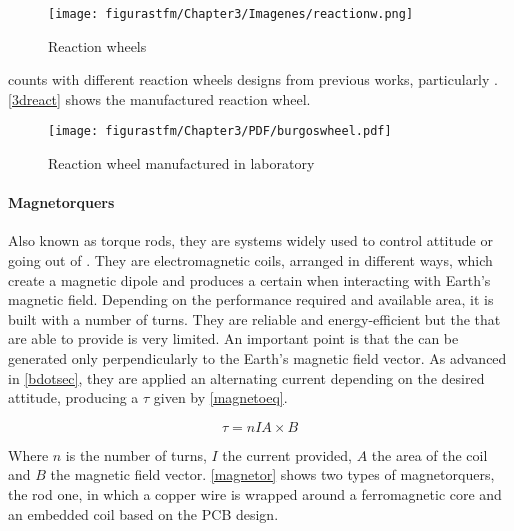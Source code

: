 			\begin{figure}[H] 
				\centering
				\texttt{[image: figurastfm/Chapter3/Imagenes/reactionw.png]}
				\caption{Reaction wheels \cite{csatshop}}      		
				\label{reactw}
  		\end{figure}
			
			 counts with different reaction wheels designs from previous works, particularly \cite{testbedgranasat}. \autoref{3dreact} shows the manufactured reaction wheel.
			
				\begin{figure}[H] 
				\centering
				\texttt{[image: figurastfm/Chapter3/PDF/burgoswheel.pdf]}
				\caption{Reaction wheel manufactured in  laboratory \cite{testbedgranasat}}      		
				\label{3dreact}
  		\end{figure}
			
\newpage
\paragraph{Magnetorquers}

Also known as torque rods, they are systems widely used to control attitude or going out of . They are electromagnetic coils, arranged in different ways, which create a magnetic dipole and produces a certain  when interacting with Earth's magnetic field. Depending on the performance required and available area, it is built with a number of turns. They are reliable and energy-efficient but the  that  are able to provide is very limited. An important point is that the  can be generated only perpendicularly to the Earth's magnetic field vector. As advanced in \ref{bdotsec}, they are applied an alternating current depending on the desired attitude, producing a  $\tau$ given by \autoref{magnetoeq}.
		
		\begin{equation}\label{magnetoeq}
		\tau=nIA\times B
		\end{equation}
		
		Where $n$ is the number of turns, $I$ the current provided, $A$ the area of the coil and $B$ the magnetic field vector. \autoref{magnetor} shows two types of magnetorquers, the rod one, in which a copper wire is wrapped around a ferromagnetic core and an embedded coil based on the \acrshort{PCB} design.

